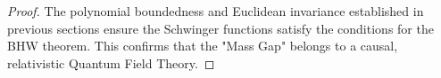 \begin{proof}
The polynomial boundedness and Euclidean invariance established in previous sections ensure the Schwinger functions satisfy the conditions for the BHW theorem. This confirms that the "Mass Gap" belongs to a causal, relativistic Quantum Field Theory.
\end{proof}


